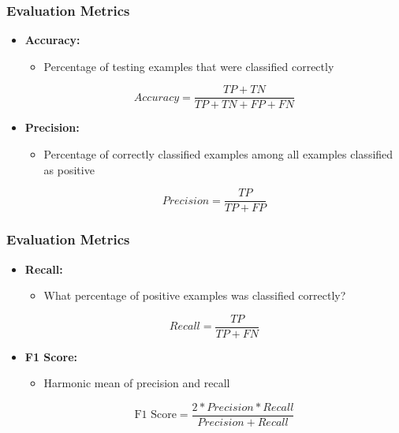 \begin{frame}
  \frametitle{Evaluation Metrics}
  \begin{itemize}
    \item \textbf{Accuracy:}
      \begin{itemize}
        \item Percentage of testing examples that were classified correctly
      \end{itemize}
      \begin{equation}
        Accuracy = \frac{TP + TN}{TP + TN + FP + FN}
      \end{equation}
    \item \textbf{Precision:}
      \begin{itemize}
        \item Percentage of correctly classified examples among all
          examples classified as positive
      \end{itemize}
      \begin{equation}
        Precision = \frac{TP}{TP + FP}
      \end{equation}
  \end{itemize}
\end{frame}

\begin{frame}
  \frametitle{Evaluation Metrics}
  \begin{itemize}
    \item \textbf{Recall:}
      \begin{itemize}
        \item What percentage of positive examples was classified
          correctly?
      \end{itemize}
      \begin{equation}
        Recall = \frac{TP}{TP + FN}
      \end{equation}
    \item \textbf{F1 Score:}
      \begin{itemize}
        \item Harmonic mean of precision and recall
      \end{itemize}
      \begin{equation}
        \text{F1 Score} = \frac{2*Precision*Recall}{Precision+Recall}
      \end{equation}
  \end{itemize}
\end{frame}

